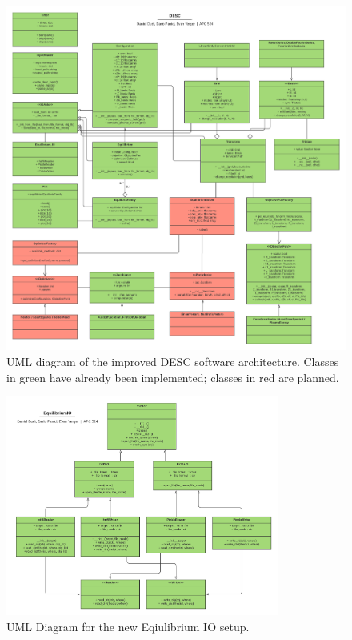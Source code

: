\documentclass{article}
\begin{document}
\begin{figure}[!h]
	\includegraphics[width=\textwidth,center]{figs/DESC_UML.pdf}
	\caption{UML diagram of the improved DESC software architecture. Classes in green have already been implemented; classes in red are planned.}
	\label{fig:DESC_UML}
\end{figure}

\begin{figure}[!h]
	\includegraphics[width=0.8\textwidth,center]{figs/EquilibriumIO_UML.pdf}
	\caption{UML Diagram for the new Eqiulibrium IO setup.}
	\label{fig:EquilIO_UML}
\end{figure}
\end{document}
